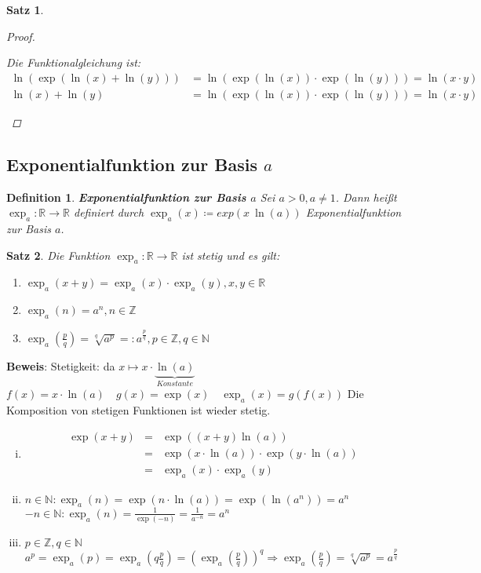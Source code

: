 \documentclass[ngerman,titlepage,twoside, parskip=half*]{scrreprt}
\newcommand*{\N}{\mathbb{N}}
\newcommand*{\Z}{\mathbb{Z}}
\newcommand*{\R}{\mathbb{R}}
\theoremstyle{break}
\newtheorem{theorem}{Satz}[section]
\newtheorem{definition}{Definition}[chapter]
\theoremstyle{nonumberbreak}
\newtheorem{proof}{Beweis:}
\begin{document}
\begin{theorem}
\begin{proof}
\begin{enumerate}[zu (i)]
    Die Funktionalgleichung ist:
    \begin{align*}
      \ln(\exp(\ln (x)+\ln(y))) &=\ln(\exp(\ln(x))\cdot \exp(\ln(y))) =
      \ln(x\cdot y)\\
      \ln(x)+\ln(y) &= \ln (\exp (\ln(x))\cdot \exp (\ln(y)))= \ln
      (x\cdot y)
    \end{align*}
  \end{enumerate}    
\end{proof}
\end{theorem}


\subsection{Exponentialfunktion zur Basis \texorpdfstring{$a$}{a}}

\begin{definition}
\textbf{Exponentialfunktion zur Basis $a$} Sei $a>0, a\neq 1$. Dann heißt $\exp_a \colon\R\rightarrow\R$ definiert durch $\exp_a (x)\coloneqq
exp(x\ \ln (a))$ \emph{Exponentialfunktion} zur Basis $a$.
\end{definition}

\begin{theorem}
\label{satz:expa}
Die Funktion $\exp_a \colon\R\rightarrow\R$ ist stetig und es gilt:
\begin{enumerate}[i]
  \item $\exp_a(x+y)=\exp_a(x)\cdot \exp_a(y), x,y \in \R$
  \item $\exp_a(n)=a^n, n\in \Z$
  \item $\exp_a (\frac{p}{q})=\sqrt[q]{a^p}=:a^{\frac{p}{q}}, p\in \Z , q\in \N$
\end{enumerate}
\end{theorem}
\textbf{Beweis}: Stetigkeit: da $x \mapsto x \cdot \underbrace{\ln (a)}_{Konstante}$\\
$f(x)=x\cdot \ln(a)\quad g(x)=\exp(x)\quad \exp_a(x)=g(f(x))$ Die Komposition von stetigen Funktionen ist wieder stetig.
\begin{enumerate}[i)]
  \item \begin{align*}
    \exp(x+y) & = & \exp((x+y)\ln (a))\\
    & = & \exp(x \cdot \ln (a))\cdot \exp(y\cdot \ln(a))\\
    & = & \exp_a(x)\cdot \exp_a(y)
  \end{align*}
  \item $n\in \N\colon \exp_a (n)=\exp(n\cdot \ln(a))=\exp(\ln(a^n))=a^n$\\
    $-n\in \N\colon \exp_a(n)=\frac{1}{\exp(-n)}=\frac{1}{a^{-n}}=a^n$
  \item $p\in \Z, q\in \N$\\
    $a^p=\exp_a(p)=\exp_a(q\frac{p}{q})=\left(\exp_a(\frac{p}{q})\right)^q\Rightarrow \exp_a(\frac{p}{q})=\sqrt[q]{a^p}=a^{\frac{p}{q}}$
\end{enumerate}
\end{document}
